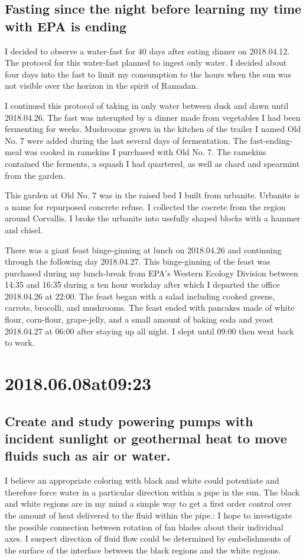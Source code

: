 \subsection*{ Fasting since the night before learning my time with EPA is ending }
I decided to observe a water-fast for 40 days after eating dinner on 2018.04.12.
The protocol for this water-fast planned to ingest only water.
I decided about four days into the fast to limit my consumption to the hours when the sun was not visible over the horizon in the spirit of Ramadan.

I continued this protocol of taking in only water between dusk and dawn until 2018.04.26.
The fast was interupted by a dinner made from vegetables I had been fermenting for weeks.
Mushrooms grown in the kitchen of the trailer I named Old No. 7 were added during the last several days of fermentation.
The fast-ending-meal was cooked in ramekins I purchased with Old No. 7.
The ramekins contained the ferments, a squash I had quartered, as well as chard and spearmint from the garden.

This garden at Old No. 7 was in the raised bed I built from urbanite.
Urbanite is a name for repurposed concrete refuse.
I collected the cocrete from the region around Corvallis.
I broke the urbanite into usefully shaped blocks with a hammer and chisel.

There was a giant feast binge-ginning at lunch on 2018.04.26 and continuing through the following day 2018.04.27.
This binge-ginning of the feast was purchased during my lunch-break from EPA's Western Ecology Division between 14:35 and 16:35 during a ten hour workday after which I departed the office 2018.04.26 at 22:00.
The feast began with a salad including cooked greens, carrots, brocolli, and mushrooms.
The feast ended with pancakes made of white flour, corn-flour, grape-jelly, and a small amount of baking soda and yeast 2018.04.27 at 06:00 after staying up all night.
I slept until 09:00 then went back to work.

\section*{ 2018.06.08at09:23 }
\subsection*{ Create and study powering pumps with incident sunlight or geothermal heat to move fluids such as air or water. }
I believe an appropriate coloring with black and white could potentiate and therefore force water in a particular direction within a pipe in the sun.
The black and white regions are in my mind a simple way to get a first order control over the amount of heat delivered to the fluid within the pipe.:
I hope to investigate the possible connection between rotation of fan blades about their individual axes.
I suspect direction of fluid flow could be determined by embelishments of the surface of the interface between the black regions and the white regions.

